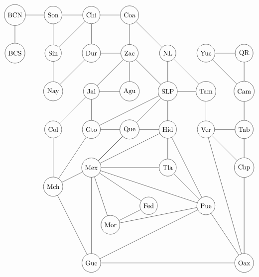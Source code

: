\documentclass[16 pt]{amsart}
\theoremstyle{definition}
\theoremstyle{remark}
\numberwithin{equation}{subsection}
\begin{document}
\[
\begin{tikzpicture}
\node[circle,draw] (BCN) at (0,10){BCN};
\node[circle,draw] (BCS) at (0,8){BCS};
\node[circle,draw] (Son) at (2,10){Son};
\node[circle,draw] (Sin) at (2,8){Sin};
\node[circle,draw] (Nay) at (2,6){Nay};
\node[circle,draw] (Col) at (2,4){Col};
\node[circle,draw] (Mch) at (2,1){Mch};
\node[circle,draw] (Chi) at (4,10){Chi};
\node[circle,draw] (Dur) at (4,8){Dur};
\node[circle,draw] (Jal) at (4,6){Jal};
\node[circle,draw] (Gto) at (4,4){Gto};
\node[circle,draw] (Mex) at (4,2){Mex};
\node[circle,draw] (Gue) at (4,-3){Gue};
\node[circle,draw] (Coa) at (6,10){Coa};
\node[circle,draw] (Zac) at (6,8){Zac};
\node[circle,draw] (Agu) at (6,6){Agu};
\node[circle,draw] (Que) at (6,4){Que};
\node[circle,draw] (Fed) at (7,0){Fed};
\node[circle,draw] (Mor) at (5,-1){Mor};
\node[circle,draw] (NL) at (8,8){NL};
\node[circle,draw] (SLP) at (8,6){SLP};
\node[circle,draw] (Hid) at (8,4){Hid};
\node[circle,draw] (Tla) at (8,2){Tla};
\node[circle,draw] (Pue) at (10,0){Pue};
\node[circle,draw] (Oax) at (12,-3){Oax};
\node[circle,draw] (Tam) at (10,6){Tam};
\node[circle,draw] (Ver) at (10,4){Ver};
\node[circle,draw] (Tab) at (12,4){Tab};
\node[circle,draw] (Chp) at (12,2){Chp};
\node[circle,draw] (Cam) at (12,6){Cam};
\node[circle,draw] (Yuc) at (10,8){Yuc};
\node[circle,draw] (QR) at (12,8){QR};
\foreach \from/\to in {BCS/BCN,BCN/Son,Son/Sin,Son/Chi,Sin/Chi,Sin/Nay,Nay/Dur,Chi/Dur,Chi/Coa,Col/Mch,Col/Jal,Dur/Zac,Coa/Zac,Jal/Zac,Jal/Gto,Mch/Gto,Mch/Gue,Jal/Agu,Coa/NL,NL/SLP,NL/Tam,SLP/Tam,Tam/Ver,Ver/Tab,Tab/Chp,Ver/Chp,Pue/Oax,Ver/Oax,SLP/Zac,Gto/SLP,SLP/Hid,Hid/Pue,Agu/Zac,Que/SLP,Que/Gto,Que/Hid,Hid/Tla,Yuc/QR,Yuc/Cam,Cam/QR,Cam/Tab,Fed/Mex,Fed/Mor,Mex/Mch,Mex/Que,Mex/Hid,Mex/Que,Mex/Mor,Mex/Tla,Mex/Pue,Mex/Gue,Oax/Chp,Gue/Oax,Pue/Tla,Pue/Mor,Pue/Gue}
  \draw (\from) -- (\to);
\end{tikzpicture}
\]
\end{document}
